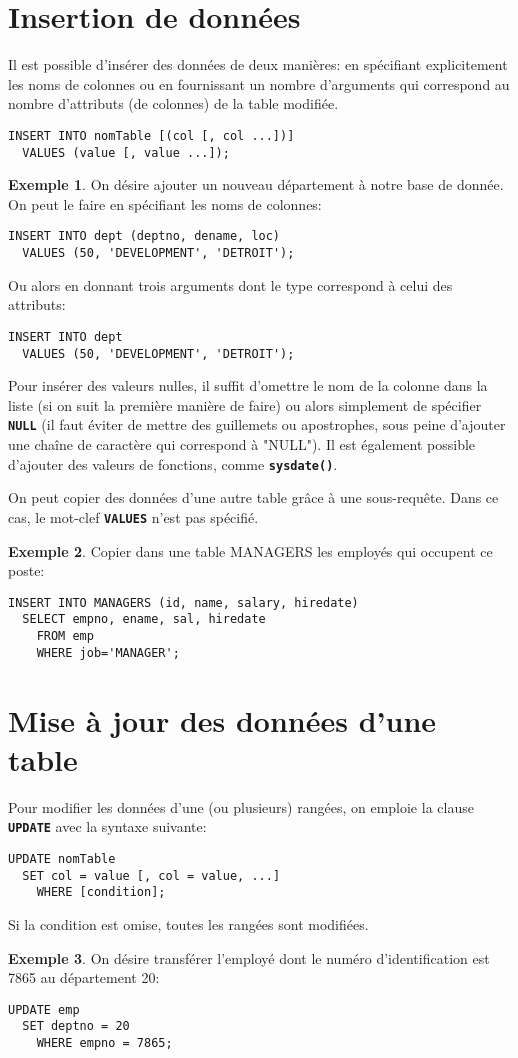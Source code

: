 \documentclass[a4paper, 12pt]{report}
\newcommand{\textSQL}[1]{\texttt{\textbf{#1}}}
\theoremstyle{definition} \newtheorem{ex}{Exemple}
\begin{document}
\section{Insertion de données}
Il est possible d'insérer des données de deux manières: en spécifiant explicitement les noms de colonnes ou en fournissant un nombre d'arguments qui correspond au nombre d'attributs (de colonnes) de la table modifiée.
\begin{lstlisting}[frame=single]
INSERT INTO nomTable [(col [, col ...])]
  VALUES (value [, value ...]);
\end{lstlisting}
\begin{ex}
On désire ajouter un nouveau département à notre base de donnée. On peut le faire en spécifiant les noms de colonnes:
\begin{lstlisting}[frame=single]
INSERT INTO dept (deptno, dename, loc)
  VALUES (50, 'DEVELOPMENT', 'DETROIT');
\end{lstlisting}
Ou alors en donnant trois arguments dont le type correspond à celui des attributs:
\begin{lstlisting}[frame=single]
INSERT INTO dept
  VALUES (50, 'DEVELOPMENT', 'DETROIT');
\end{lstlisting}
\end{ex}
Pour insérer des valeurs nulles, il suffit d'omettre le nom de la colonne dans la liste (si on suit la première manière de faire) ou alors simplement de spécifier \textSQL{NULL} (il faut éviter de mettre des guillemets ou apostrophes, sous peine d'ajouter une chaîne de caractère qui correspond à "NULL"). Il est également possible d'ajouter des valeurs de fonctions, comme \textSQL{sysdate()}.

On peut copier des données d'une autre table grâce à une sous-requête. Dans ce cas, le mot-clef \textSQL{VALUES} n'est pas spécifié.
\begin{ex}
	Copier dans une table MANAGERS les employés qui occupent ce poste:
\begin{lstlisting}[frame=single]
INSERT INTO MANAGERS (id, name, salary, hiredate)
  SELECT empno, ename, sal, hiredate
	FROM emp
	WHERE job='MANAGER';
\end{lstlisting}
\end{ex}

\section{Mise à jour des données d'une table}
Pour modifier les données d'une (ou plusieurs) rangées, on emploie la clause \textSQL{UPDATE} avec la syntaxe suivante:
\begin{lstlisting}[frame=single]
UPDATE nomTable
  SET col = value [, col = value, ...]
	WHERE [condition];
\end{lstlisting}
Si la condition est omise, toutes les rangées sont modifiées.
\begin{ex}
On désire transférer l'employé dont le numéro d'identification est 7865 au département 20:
\begin{lstlisting}[frame=single]
UPDATE emp
  SET deptno = 20
	WHERE empno = 7865;
\end{lstlisting}
\end{ex}
\end{document}
